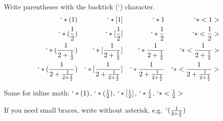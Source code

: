 \documentclass{article}
\begin{document}
Write parentheses with the backtick (`) character.
\begin{align*}
    `*(1)                                       &  & `*[1]                                       &  & `*{1}                                       &  & `*<1>                                       \\
    `*(\frac{1}{2})                             &  & `*[\frac{1}{2}]                             &  & `*{\frac{1}{2}}                             &  & `*<\frac{1}{2}>                             \\
    `*(\frac{1}{2 + \frac{1}{2}})               &  & `*[\frac{1}{2 + \frac{1}{2}}]               &  & `*{\frac{1}{2 + \frac{1}{2}}}               &  & `*<\frac{1}{2 + \frac{1}{2}}>               \\
    `*(\frac{1}{2 + \frac{1}{2 + \frac{1}{2}}}) &  & `*[\frac{1}{2 + \frac{1}{2 + \frac{1}{2}}}] &  & `*{\frac{1}{2 + \frac{1}{2 + \frac{1}{2}}}} &  & `*<\frac{1}{2 + \frac{1}{2 + \frac{1}{2}}}> \\
\end{align*}

Same for inline math: \( `*(1) \), \( `*(\frac{1}{2}) \), \( `*[\frac{1}{2}] \), \( `*{\frac{1}{2}} \), \( `*<\frac{1}{2}> \)

If you need small braces, write without asterisk, e.g.~\( `(\frac{1}{2 + \frac{1}{2}}) \)
\end{document}
